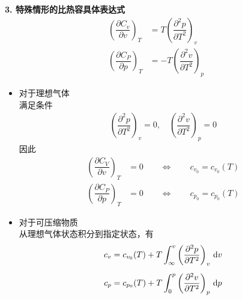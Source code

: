 \noindent \textbf{3. 特殊情形的比热容具体表达式}
\begin{align*}
	\left(\dfrac{\partial C_v}{\partial v}\right)_T &=  T \left(\dfrac{\partial^2 p}{\partial T^2}\right)_v\\
	\left(\dfrac{\partial C_P}{\partial p}\right)_T &= - T \left(\dfrac{\partial^2 v}{\partial T^2}\right)_p
\end{align*}
\begin{itemize}
	\item 对于理想气体\\
	\hspace*{2em} 满足条件
	\begin{align*}
	 \left(\dfrac{\partial^2 p}{\partial T^2}\right)_v = 0, \quad \left(\dfrac{\partial^2 v}{\partial T^2}\right)_p = 0
	\end{align*}
	因此
	\begin{align}
		\left(\dfrac{\partial C_V}{\partial v}\right)_T  &= 0 \quad \quad \Leftrightarrow \quad \quad c_{v_0} = c_{v_0}(T)\\[0.5em]
		\left(\dfrac{\partial C_P}{\partial p}\right)_T &= 0 \quad \quad \Leftrightarrow \quad \quad c_{p_0} = c_{p_0}(T)
	\end{align}
	\item 对于可压缩物质\\
	\hspace*{2em} 从理想气体状态积分到指定状态，有
	\begin{align}
		c_v &= c_{v_0}(T) + T \int_{\infty}^{v} \left(\dfrac{\partial^2 p}{\partial T^2}\right)_v \, {\rm{d}} v\\[0.5em]
		c_p &= c_{p_0}(T) + T \int_{0}^{p} \left(\dfrac{\partial^2 v}{\partial T^2}\right)_p \, {\rm{d}} p
	\end{align}
\end{itemize}

